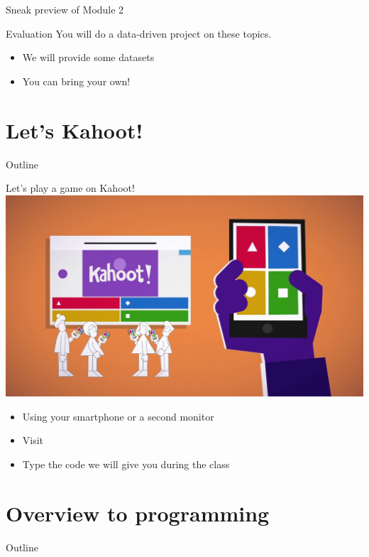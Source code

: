 \documentclass{beamer}%
\begin{document}
\begin{frame}{Sneak preview of Module 2}
	\begin{block}{Evaluation}
		You will do a data-driven project on these topics.
	\begin{itemize}
		\item We will provide some datasets
		\item You can bring your own!
	\end{itemize}
	\end{block}
	
\end{frame}

\section{Let's Kahoot!}
\begin{frame}{Outline}
	\tableofcontents[currentsection]
\end{frame}

\begin{frame}{Let's play a game on Kahoot!}
	\centering
\includegraphics[width=0.8\linewidth]{figures/kahoot.jpg}
	\begin{itemize}	
	\item Using your smartphone or a second monitor
	\item Visit	
	\item Type the code we will give you during the class
	\end{itemize}
\end{frame}

\section{Overview to programming}
\begin{frame}{Outline}
	\tableofcontents[currentsection]
\end{frame}
\end{document}

